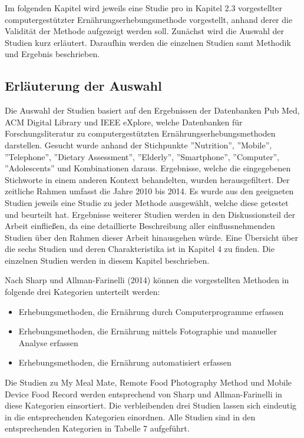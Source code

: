 Im folgenden Kapitel wird jeweils eine Studie pro in Kapitel 2.3 vorgestellter  computergestützter Ernährungserhebungsmethode vorgestellt, anhand derer die Validität der Methode aufgezeigt werden soll.  Zunächst wird die Auswahl der Studien kurz erläutert. Daraufhin werden die einzelnen Studien samt Methodik und Ergebnis beschrieben. 

\subsection{Erläuterung der Auswahl}

Die Auswahl der Studien basiert auf den Ergebnissen der Datenbanken Pub Med, ACM Digital Library und IEEE eXplore, welche Datenbanken für  Forschungsliteratur zu computergestützten Ernährungserhebungsmethoden darstellen. Gesucht wurde anhand der Stichpunkte ''Nutrition'', ''Mobile'', ''Telephone'', ''Dietary Assessment'', ''Elderly'', ''Smartphone'', ''Computer'', ''Adolescents'' und Kombinationen daraus. Ergebnisse, welche die eingegebenen Stichworte in einem anderen Kontext behandelten, wurden herausgefiltert. Der zeitliche Rahmen umfasst die Jahre 2010 bis 2014. Es wurde aus den geeigneten Studien jeweils eine Studie zu jeder Methode ausgewählt, welche diese getestet und beurteilt hat. Ergebnisse weiterer Studien werden in den Diskussionsteil der Arbeit einfließen, da eine detaillierte Beschreibung aller einflussnehmenden Studien über den Rahmen dieser Arbeit hinausgehen würde. Eine Übersicht über die sechs Studien und deren Charakteristika ist in Kapitel 4 zu finden. Die einzelnen Studien werden in diesem Kapitel beschrieben.

Nach Sharp und Allman-Farinelli (2014) können die vorgestellten Methoden in folgende drei Kategorien unterteilt werden:
\begin{itemize}
\item Erhebungsmethoden, die Ernährung durch Computerprogramme erfassen
\item Erhebungsmethoden, die Ernährung mittels Fotographie und manueller Analyse erfassen
\item Erhebungsmethoden, die Ernährung automatisiert erfassen
\end{itemize}

Die Studien zu My Meal Mate, Remote Food Photography Method und Mobile Device Food Record werden entsprechend von Sharp und Allman-Farinelli in diese Kategorien einsortiert. Die verbleibenden drei Studien lassen sich eindeutig in die entsprechenden Kategorien einordnen. Alle Studien sind in den entsprechenden Kategorien in Tabelle 7 aufgeführt. 

